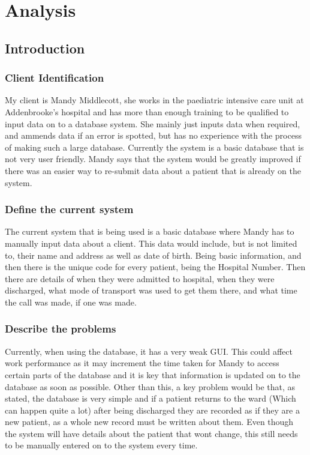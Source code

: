 \chapter{Analysis}

\section{Introduction}

\subsection{Client Identification}
My client is Mandy Middlecott, she works in the paediatric intensive care unit at Addenbrooke's hospital and has more than enough training to be qualified to input data on to a database system. She mainly just inputs data when required, and ammends data if an error is spotted, but has no experience with the process of making such a large database. Currently the system is a basic database that is not very user friendly. Mandy says that the system would be greatly improved if there was an easier way to re-submit data about a patient that is already on the system.
\subsection{Define the current system}
The current system that is being used is a basic database where Mandy has to manually input data about a client. This data would include, but is not limited to, their name and address as well as date of birth. Being basic information, and then there is the unique code for every patient, being the Hospital Number. Then there are details of when they were admitted to hospital, when they were discharged, what mode of transport was used to get them there, and what time the call was made, if one was made.
\subsection{Describe the problems}
Currently, when using the database, it has a very weak GUI. This could affect work performance as it may increment the time taken for Mandy to access certain parts of the database and it is key that information is updated on to the database as soon as possible. Other than this, a key problem would be that, as stated, the database is very simple and if a patient returns to the ward (Which can happen quite a lot) after being discharged they are recorded as if they are a new patient, as a whole new record must be written about them. Even though the system will have details about the patient that wont change, this still needs to be manually entered on to the system every time.

